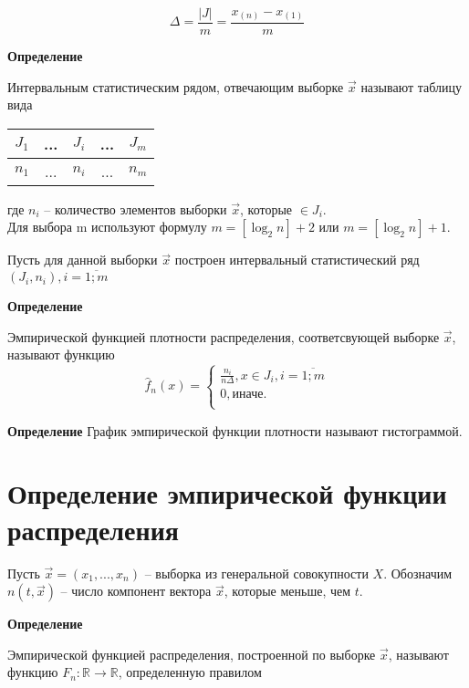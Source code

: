 \begin{equation*}
    \Delta = \frac{|J|}{m} = \frac{x_{(n)} - x_{(1)}}{m}
\end{equation*}

\textbf{Определение}

Интервальным статистическим рядом, отвечающим выборке $\vec x$ называют таблицу вида

\begin{table}[htb]
    \centering
    \begin{tabular}{|c|c|c|c|c|}
        \hline
        $J_1$ & ... & $J_i$ & ... & $J_m$ \\
        \hline
        $n_1$ & ... & $n_i$ & ... & $n_m$ \\
        \hline
    \end{tabular}
\end{table}где $n_i$ -- количество элементов выборки $\vec x$, которые $\in J_i$.
\\
Для выбора m используют формулу $m=[\log_2n]+2$ или $m=[\log_2n]+1.$

Пусть для данной выборки $\vec x$ построен интервальный статистический ряд $(J_i, n_i), i = \overline{1; m}$

\textbf{Определение}

Эмпирической функцией плотности распределения, соответсвующей выборке $\vec x$, называют функцию
\begin{equation}
    \hat f_n(x) =
    \begin{cases}
        \frac{n_i}{n \Delta}, x \in J_i, i = \overline{1; m} \\
        0, \text{иначе.} \\
    \end{cases}
\end{equation}


\textbf{Определение}
График эмпирической функции плотности называют гистограммой.


\section{Определение эмпирической функции распределения}

Пусть $\vec x = (x_1, ..., x_n)$ -- выборка из генеральной совокупности $X$. Обозначим $n(t, \vec x)$ -- число компонент вектора $\vec x$, которые меньше, чем $t$.

\textbf{Определение}

Эмпирической функцией распределения, построенной по выборке $\vec x$, называют функцию $F_n: \mathbb{R} \to \mathbb{R}$, определенную правилом 


